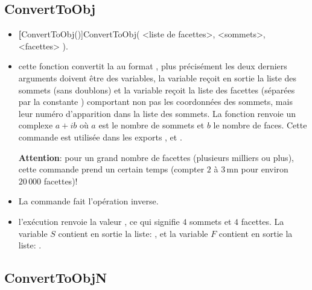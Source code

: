 \subsection{ConvertToObj}\label{cmdConvertToObj}

\begin{itemize}
 \item \util \textbf[ConvertToObj()]{ConvertToObj( <liste de facettes>, <sommets>, <facettes> )}.
 \item \desc cette fonction convertit la  au format , plus précisément les deux derniers arguments doivent être des variables, la variable  reçoit en sortie la liste des sommets (sans doublons) et la variable  reçoit la liste des facettes (séparées par la constante \jump) comportant non pas les coordonnées des sommets, mais leur numéro d'apparition dans la liste des sommets. La fonction renvoie un complexe $a+ib$ où $a$ est le nombre de sommets et $b$ le nombre de faces. Cette commande est utilisée dans les exports ,  et .

 \textbf{Attention}: pour un grand nombre de facettes (plusieurs milliers ou plus), cette commande prend un certain temps (compter $2$ à $3\,$mn pour environ $20\,000$ facettes)!
 \item La commande  fait l'opération inverse.
 \item \exem l'exécution  renvoie la valeur , ce qui signifie $4$ sommets et $4$ facettes. La variable $S$ contient en sortie la liste: \res{[0,0,3*i,0,2,0,0,1]}, et la variable $F$ contient en sortie la liste: . 
\end{itemize}

\subsection{ConvertToObjN}\label{cmdConvertToObjN}

